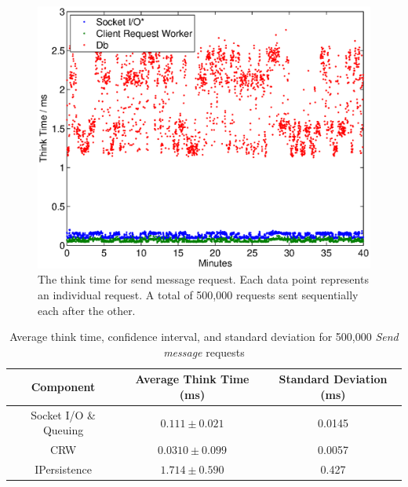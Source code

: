 \documentclass{article}
\begin{document}
                \begin{figure}[H]
                    \includegraphics[scale=0.50]{thinktime_500k_push}
                    \caption{The think time for send message request. Each data point represents an individual request. A total of 500,000 requests sent sequentially each after the other.}
                    \label{fig:thinktime_500k_push}
                \end{figure}
                \begin{table}[H]
                    \begin{tabular}{|c|c|c|}
                        \hline 
                        \textbf{Component} & \textbf{Average Think Time} (ms) & \textbf{Standard Deviation (ms)} \\ 
                        \hline 
                        Socket I/O \& Queuing & $0.111 \pm 0.021$ &0.0145\\ 
                        \hline 
                        CRW & $0.0310 \pm0.099$ &0.0057\\ 
                        \hline 
                        IPersistence & $1.714 \pm 0.590$ &0.427\\ 
                        \hline 
                    \end{tabular}
                    \caption{Average think time, confidence interval, and standard deviation for 500,000 \textit{Send message} requests}
                    \label{table:thinktime_500k_push}
                \end{table} 
                
\end{document}
